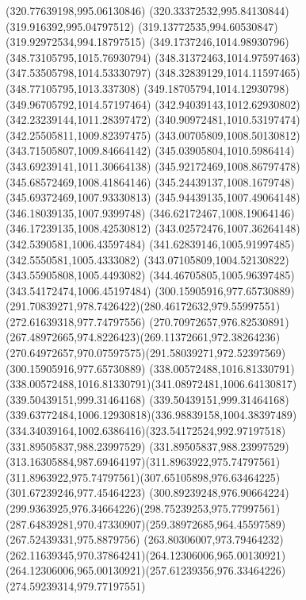 {{		\lineto(320.77639198,995.06130846)
		\lineto(320.33372532,995.84130844)
		\lineto(319.916392,995.04797512)
		\lineto(319.13772535,994.60530847)
		\lineto(319.92972534,994.18797515)
		\closepath
		\moveto(349.1737246,1014.98930796)
		\lineto(348.73105795,1015.76930794)
		\lineto(348.31372463,1014.97597463)
		\lineto(347.53505798,1014.53330797)
		\lineto(348.32839129,1014.11597465)
		\lineto(348.77105795,1013.337308)
		\lineto(349.18705794,1014.12930798)
		\lineto(349.96705792,1014.57197464)
		\closepath
		\moveto(342.94039143,1012.62930802)
		\lineto(342.23239144,1011.28397472)
		\lineto(340.90972481,1010.53197474)
		\lineto(342.25505811,1009.82397475)
		\lineto(343.00705809,1008.50130812)
		\lineto(343.71505807,1009.84664142)
		\lineto(345.03905804,1010.5986414)
		\lineto(343.69239141,1011.30664138)
		\closepath
		\moveto(345.92172469,1008.86797478)
		\lineto(345.68572469,1008.41864146)
		\lineto(345.24439137,1008.1679748)
		\lineto(345.69372469,1007.93330813)
		\lineto(345.94439135,1007.49064148)
		\lineto(346.18039135,1007.9399748)
		\lineto(346.62172467,1008.19064146)
		\lineto(346.17239135,1008.42530812)
		\closepath
		\moveto(343.02572476,1007.36264148)
		\lineto(342.5390581,1006.43597484)
		\lineto(341.62839146,1005.91997485)
		\lineto(342.5550581,1005.4333082)
		\lineto(343.07105809,1004.52130822)
		\lineto(343.55905808,1005.4493082)
		\lineto(344.46705805,1005.96397485)
		\lineto(343.54172474,1006.45197484)
		\closepath
		\moveto(300.15905916,977.65730889)
		\curveto(291.70839271,978.7426422)(280.46172632,979.55997551)(272.61639318,977.74797556)
		\curveto(270.70972657,976.82530891)(267.48972665,974.8226423)(269.11372661,972.38264236)
		\curveto(270.64972657,970.07597575)(291.58039271,972.52397569)(300.15905916,977.65730889)
		\moveto(338.00572488,1016.81330791)
		\curveto(338.00572488,1016.81330791)(341.08972481,1006.64130817)(339.50439151,999.31464168)
		\curveto(339.50439151,999.31464168)(339.63772484,1006.12930818)(336.98839158,1004.38397489)
		\curveto(334.34039164,1002.6386416)(323.54172524,992.97197518)(331.89505837,988.23997529)
		\curveto(331.89505837,988.23997529)(313.16305884,987.69464197)(311.8963922,975.74797561)
		\curveto(311.8963922,975.74797561)(307.65105898,976.63464225)(301.67239246,977.45464223)
		\curveto(300.89239248,976.90664224)(299.9363925,976.34664226)(298.75239253,975.77997561)
		\curveto(287.64839281,970.47330907)(259.38972685,964.45597589)(267.52439331,975.8879756)
		\curveto(263.80306007,973.79464232)(262.11639345,970.37864241)(264.12306006,965.00130921)
		\curveto(264.12306006,965.00130921)(257.61239356,976.33464226)(274.59239314,979.77197551)
}}

